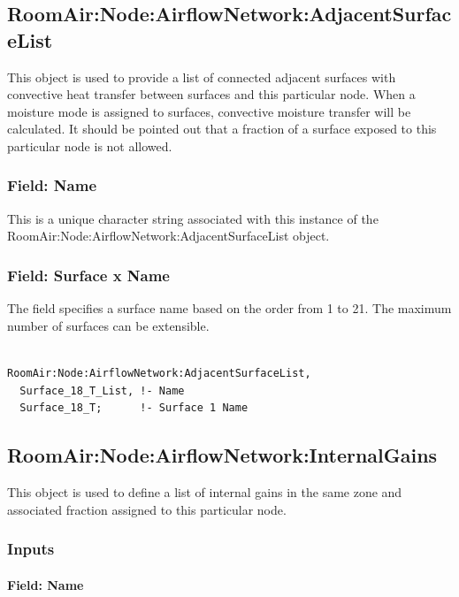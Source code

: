 \subsection{RoomAir:Node:AirflowNetwork:AdjacentSurfaceList}\label{roomairnodeairflownetworkadjacentsurfacelist}

This object is used to provide a list of connected adjacent surfaces with convective heat transfer between surfaces and this particular node. When a moisture mode is assigned to surfaces, convective moisture transfer will be calculated. It should be pointed out that a fraction of a surface exposed to this particular node is not allowed.

\subsubsection{Field: Name}\label{field-name-9-015}

This is a unique character string associated with this instance of the Room\-Air\-:Node:\-Airflow\-Network:\-Adjacent\-Surface\-List object.

\subsubsection{Field: Surface x Name}\label{field-surface-x-name-000}

The field specifies a surface name based on the order from 1 to 21. The maximum number of surfaces can be extensible.

\begin{lstlisting}

RoomAir:Node:AirflowNetwork:AdjacentSurfaceList,
  Surface_18_T_List, !- Name
  Surface_18_T;      !- Surface 1 Name
\end{lstlisting}

\subsection{RoomAir:Node:AirflowNetwork:InternalGains}\label{roomairnodeairflownetworkinternalgains}

This object is used to define a list of internal gains in the same zone and associated fraction assigned to this particular node.

\subsubsection{Inputs}\label{inputs-14-012}

\paragraph{Field: Name}\label{field-name-10-014}


